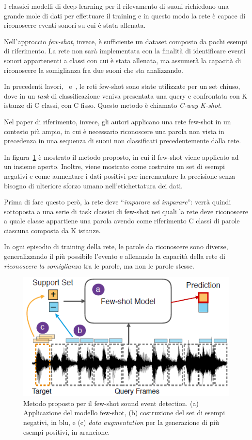 \documentclass[12pt,a4paper,titlepage]{article}
\begin{document}
I classici modelli di deep-learning per il rilevamento di suoni richiedono una grande mole di dati per effettuare il training e in questo modo la rete è capace di riconoscere eventi sonori su cui è stata allenata.

Nell'approccio \textit{few-shot}, invece, è sufficiente un dataset composto da pochi esempi di riferimento. La rete non sarà implementata con la finalità di identificare eventi sonori appartenenti a classi con cui è stata allenata, ma assumerà la capacità di riconoscere la somiglianza fra due suoni che sta analizzando.

In precedenti lavori,~\cite{chou:learning_to_match} e~\cite{zhang:few_shot}, le reti few-shot sono state utilizzate per un set chiuso, dove in un \textit{task} di classificazione veniva presentata una query e confrontata con K istanze di C classi, con C fisso. Questo metodo è chiamato \textit{C-way K-shot}.

Nel paper di riferimento, invece, gli autori applicano una rete few-shot in un contesto più ampio, in cui è necessario riconoscere una parola non vista in precedenza in una sequenza di suoni non classificati precedentemente dalla rete.

In figura~\ref{fig:few_shot_sound_event_detection_method} è mostrato il metodo proposto, in cui il few-shot viene applicato ad un insieme aperto. Inoltre, viene mostrato come costruire un set di esempi negativi e come aumentare i dati positivi per incrementare la precisione senza bisogno di ulteriore sforzo umano nell'etichettatura dei dati.

Prima di fare questo però, la rete deve ``\textit{imparare ad imparare}'': verrà quindi sottoposta a una serie di task classici di few-shot nei quali la rete deve riconoscere a quale classe appartiene una parola avendo come riferimento C classi di parole ciascuna composta da K istanze.

In ogni episodio di training della rete, le parole da riconoscere sono diverse, generalizzando il più possibile l'evento e allenando la capacità della rete di \textit{riconoscere la somiglianza} tra le parole, ma non le parole stesse.

\begin{figure}[h]
	\centering	
	\includegraphics[width=.7\textwidth]{Immagini/few_shot_sound_event_detection_method}
	\caption{Metodo proposto per il few-shot sound event detection. (a) Applicazione del modello few-shot, (b) costruzione del set di esempi negativi, in blu, e (c) \textit{data augmentation} per la generazione di più esempi positivi, in arancione.~\cite{salamon:Few-Shot}}
	\label{fig:few_shot_sound_event_detection_method}
\end{figure}
\end{document}
